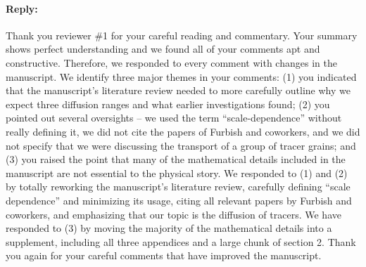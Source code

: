 \documentclass[11pt]{article}
\begin{document}
\paragraph{Reply:}
Thank you reviewer \#1 for your careful reading and commentary. Your summary shows perfect understanding and we found all of your comments apt and constructive. Therefore, we responded to every comment with changes in the manuscript. We identify three major themes in your comments: (1) you indicated that the manuscript's literature review needed to more carefully outline why we expect three diffusion ranges and what earlier investigations found; (2) you pointed out several oversights --  we used the term ``scale-dependence'' without really defining it, we did not cite the papers of Furbish and coworkers, and we did not specify that we were discussing the transport of a group of tracer grains; and (3) you raised the point that many of the mathematical details included in the manuscript are not essential to the physical story. We responded to (1) and (2) by totally reworking the manuscript's literature review, carefully defining ``scale dependence'' and minimizing its usage, citing all relevant papers by Furbish and coworkers, and emphasizing that our topic is the diffusion of tracers. We have responded to (3) by moving the majority of the mathematical details into a supplement, including all three appendices and a large chunk of section 2. Thank you again for your careful comments that have improved the manuscript.
\end{document}
